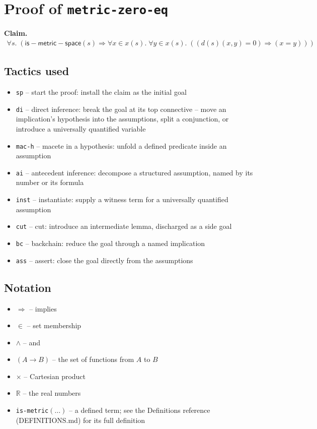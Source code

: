 \documentclass[11pt]{article}
\begin{document}
\section*{Proof of \texttt{metric-zero-eq}}
\textbf{Claim.}
\begin{align*}
  \forall s.\; (\mathsf{is{-}metric{-}space}(s) \Rightarrow \forall x \in x(s).\; \forall y \in x(s).\; ((d(s)(x, y) = 0) \Rightarrow (x = y)))
\end{align*}
\bigskip

\subsection*{Tactics used}
\begin{itemize}
\item \texttt{sp} -- start the proof: install the claim as the initial goal
\item \texttt{di} -- direct inference: break the goal at its top connective -- move an implication's hypothesis into the assumptions, split a conjunction, or introduce a universally quantified variable
\item \texttt{mac-h} -- macete in a hypothesis: unfold a defined predicate inside an assumption
\item \texttt{ai} -- antecedent inference: decompose a structured assumption, named by its number or its formula
\item \texttt{inst} -- instantiate: supply a witness term for a universally quantified assumption
\item \texttt{cut} -- cut: introduce an intermediate lemma, discharged as a side goal
\item \texttt{bc} -- backchain: reduce the goal through a named implication
\item \texttt{ass} -- assert: close the goal directly from the assumptions
\end{itemize}

\subsection*{Notation}
\begin{itemize}
\item $\Rightarrow$ -- implies
\item $\in$ -- set membership
\item $\wedge$ -- and
\item $(A \to B)$ -- the set of functions from $A$ to $B$
\item $\times$ -- Cartesian product
\item $\mathbb{R}$ -- the real numbers
\item \texttt{is-metric}$(\ldots)$ -- a defined term; see the Definitions reference (DEFINITIONS.md) for its full definition
\end{itemize}
\end{document}
